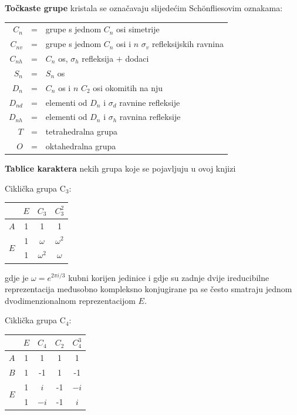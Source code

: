 \textbf{Točkaste grupe} kristala se označavaju slijedećim
Sch\"{o}nfliesovim oznakama:
\begin{center}
\begin{tabular}{rcl}
$C_n$ & = & grupe s jednom $C_n$ osi simetrije \\
$C_{nv}$ & = & grupe s jednom $C_n$ osi i $n$ $\sigma_v$
   refleksijskih ravnina  \\
$C_{nh}$ & = & $C_n$ os,  $\sigma_h$ refleksija $+$ dodaci \\
$S_{n}$ & = & $S_n$ os \\
$D_{n}$ & = & $C_n$ os i $n$ $C_2$ osi okomitih na nju \\
$D_{nd}$ & = & elementi od $D_{n}$ i $\sigma_d$ ravnine refleksije \\
$D_{nh}$ & = & elementi od $D_{n}$ i $\sigma_h$ ravnina refleksije \\
$T$  & = & tetrahedralna grupa \\
$O$  & = & oktahedralna grupa 
\end{tabular}
\end{center}

\textbf{Tablice karaktera} nekih grupa koje se pojavljuju u ovoj knjizi

Ciklička grupa C$_3$:
\begin{center}
\begin{tabular}{c|ccc}
     & $E$ & $C_3$ & $C_{3}^2$ \\ \hline
    $A$ & 1 & 1 & 1 \\
    \multirow{2}{*}{$E$} & 1 & $\omega$ & $\omega^2$ \\
     & 1 & $\omega^2$ & $\omega$ \\
\end{tabular}
\end{center}
gdje je $\omega = e^{2\pi i/3}$ kubni korijen jedinice i
gdje su zadnje dvije ireducibilne reprezentacija međusobno
kompleksno konjugirane pa se često smatraju jednom dvodimenzionalnom
reprezentacijom $E$.

Ciklička grupa C$_4$:
\begin{center}
\begin{tabular}{c|cccc}
     & $E$ & $C_4$ & $C_2$ & $C_{4}^3$ \\ \hline
    $A$ & 1 & 1 & 1 & 1 \\
    $B$ & 1 & -1 & 1 & -1 \\
    \multirow{2}{*}{$E$} & 1 & $i$ & -1 & $-i$ \\
     & 1 & $-i$ & -1 & $i$ \\
\end{tabular}
\end{center}

